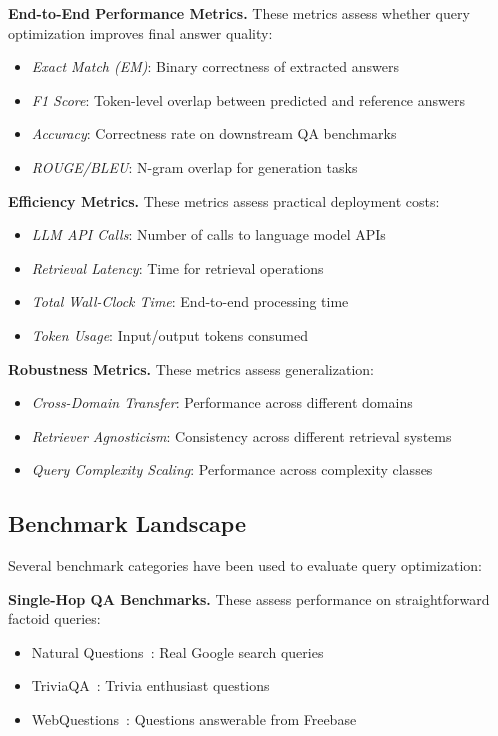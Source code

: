 \documentclass{article}
\begin{document}
\textbf{End-to-End Performance Metrics.} These metrics assess whether query optimization improves final answer quality:
\begin{itemize}[leftmargin=*,nosep]
    \item \textit{Exact Match (EM)}: Binary correctness of extracted answers
    \item \textit{F1 Score}: Token-level overlap between predicted and reference answers
    \item \textit{Accuracy}: Correctness rate on downstream QA benchmarks
    \item \textit{ROUGE/BLEU}: N-gram overlap for generation tasks
\end{itemize}

\textbf{Efficiency Metrics.} These metrics assess practical deployment costs:
\begin{itemize}[leftmargin=*,nosep]
    \item \textit{LLM API Calls}: Number of calls to language model APIs
    \item \textit{Retrieval Latency}: Time for retrieval operations
    \item \textit{Total Wall-Clock Time}: End-to-end processing time
    \item \textit{Token Usage}: Input/output tokens consumed
\end{itemize}

\textbf{Robustness Metrics.} These metrics assess generalization:
\begin{itemize}[leftmargin=*,nosep]
    \item \textit{Cross-Domain Transfer}: Performance across different domains
    \item \textit{Retriever Agnosticism}: Consistency across different retrieval systems
    \item \textit{Query Complexity Scaling}: Performance across complexity classes
\end{itemize}

\subsection{Benchmark Landscape}

Several benchmark categories have been used to evaluate query optimization:

\textbf{Single-Hop QA Benchmarks.} These assess performance on straightforward factoid queries:
\begin{itemize}[leftmargin=*,nosep]
    \item Natural Questions~\citep{DBLP:journals/tacl/KwiatkowskiPRCP19}: Real Google search queries
    \item TriviaQA~\citep{DBLP:conf/acl/JoshiCWZ17}: Trivia enthusiast questions
    \item WebQuestions~\citep{WebQuestions}: Questions answerable from Freebase
\end{itemize}
\end{document}
